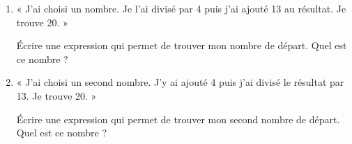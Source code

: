 
\begin{exercice}\label{exosmath-0738}


    \begin{enumerate}
        \item
            
« J'ai choisi un nombre. Je l'ai divisé par 4
puis j'ai ajouté 13 au résultat. Je trouve 20. »

Écrire une expression qui permet de trouver mon
nombre de départ. Quel est ce nombre ?
\item

« J'ai choisi un second nombre. J'y ai ajouté 4
puis j'ai divisé le résultat par 13. Je trouve 20. »

Écrire une expression qui permet de trouver mon
second nombre de départ. Quel est ce nombre ?
    \end{enumerate}

\end{exercice}

